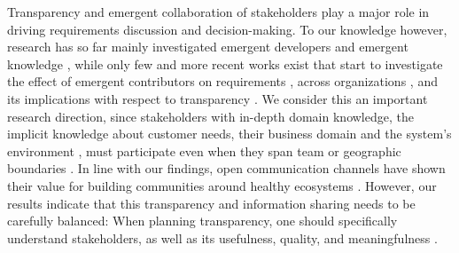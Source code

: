 Transparency and emergent collaboration of stakeholders play a major role in driving requirements discussion and decision-making.
To our knowledge however, research has so far mainly investigated emergent developers \cite{Minto2007,Haenni2014,Sadi2015} and emergent knowledge \cite{Treude2012}, while only few and more recent works exist that start to investigate the effect of emergent contributors on requirements \cite{Kwan2011}, across organizations \cite{Linaker2016,KYB+2016}, and its implications with respect to transparency \cite{Dabbish2013,Hosseini2016}. 
We consider this an important research direction, since stakeholders with in-depth domain knowledge, the implicit knowledge about customer needs, their business domain and the system’s environment \cite{Damian2013}, must participate even when they span team or geographic boundaries \cite{boden2009bridging}.
In line with our findings, open communication channels have shown their value for building communities around healthy ecosystems  \cite{Kilamo2012}. 
However, our results indicate that this transparency and information sharing needs to be carefully balanced: When planning transparency, one should specifically understand stakeholders, %
as well as its usefulness, quality, and meaningfulness \cite{Hosseini2016}.
